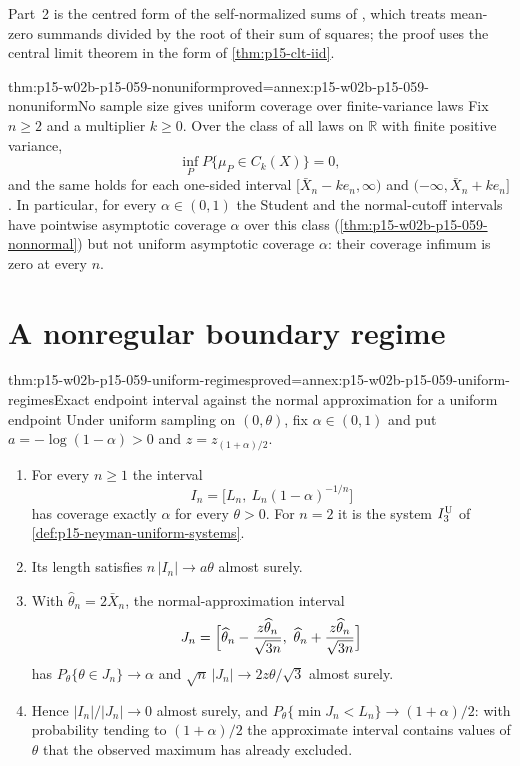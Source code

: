 Part~2 is the centred form of the self-normalized sums of
\cite[p.~147, Exercise~3.4.5]{DurrettPTEAuthor2019}, which treats mean-zero
summands divided by the root of their sum of squares; the proof uses the
central limit theorem \cite[p.~144, Theorem~3.4.1]{DurrettPTEAuthor2019} in
the form of \cref{thm:p15-clt-iid}.

\begin{hbtheorem}{thm:p15-w02b-p15-059-nonuniform}{proved=annex:p15-w02b-p15-059-nonuniform}{No sample size gives uniform coverage over finite-variance laws}
Fix \(n\geq2\) and a multiplier \(k\geq0\). Over the class of all laws on
\(\mathbb R\) with finite positive variance,
\[
 \inf_P P\{\mu_P\in C_k(X)\}=0,
\]
and the same holds for each one-sided interval
\([\bar X_n-ke_n,\infty)\) and \((-\infty,\bar X_n+ke_n]\).
In particular, for every \(\alpha\in(0,1)\) the Student and the
normal-cutoff intervals have pointwise asymptotic coverage \(\alpha\)
over this class (\cref{thm:p15-w02b-p15-059-nonnormal}) but not uniform
asymptotic coverage \(\alpha\): their coverage infimum is zero at every
\(n\).
\end{hbtheorem}

\section{A nonregular boundary regime}
\label{sec:p15-w02b-p15-059-boundary}

\begin{hbtheorem}{thm:p15-w02b-p15-059-uniform-regimes}{proved=annex:p15-w02b-p15-059-uniform-regimes}{Exact endpoint interval against the normal approximation for a uniform endpoint}
Under uniform sampling on \((0,\theta)\), fix \(\alpha\in(0,1)\) and put
\(a=-\log(1-\alpha)>0\) and \(z=z_{(1+\alpha)/2}\).
\begin{enumerate}
\item For every \(n\geq1\) the interval
\[
 I_n=\bigl[L_n,\ L_n(1-\alpha)^{-1/n}\bigr]
\]
has coverage exactly \(\alpha\) for every \(\theta>0\). For \(n=2\) it is
the system \(I_3^{\rm U}\) of \cref{def:p15-neyman-uniform-systems}.
\item Its length satisfies \(n\,|I_n|\to a\theta\) almost surely.
\item With \(\widehat\theta_n=2\bar X_n\), the normal-approximation interval
\[
 J_n=\Bigl[\widehat\theta_n-\frac{z\widehat\theta_n}{\sqrt{3n}},\
            \widehat\theta_n+\frac{z\widehat\theta_n}{\sqrt{3n}}\Bigr]
\]
has \(P_\theta\{\theta\in J_n\}\to\alpha\) and
\(\sqrt n\,|J_n|\to2z\theta/\sqrt3\) almost surely.
\item Hence \(|I_n|/|J_n|\to0\) almost surely, and
\(P_\theta\{\min J_n<L_n\}\to(1+\alpha)/2\): with probability tending to
\((1+\alpha)/2\) the approximate interval contains values of \(\theta\)
that the observed maximum has already excluded.
\end{enumerate}
\end{hbtheorem}

